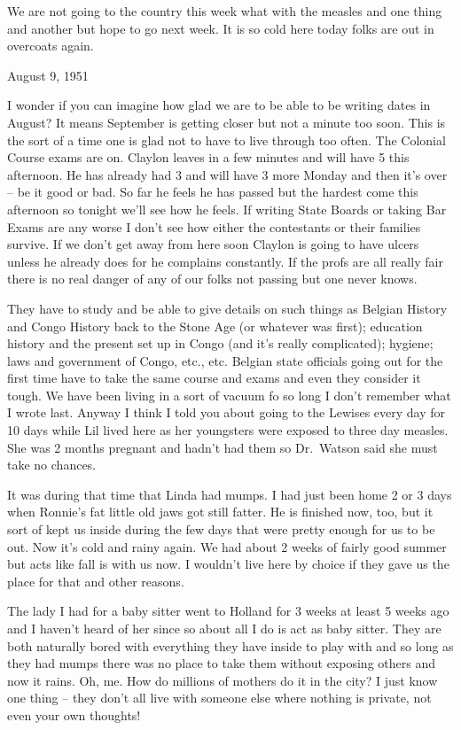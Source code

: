 \documentclass[]{book}
\begin{document}
We are not going to the country this week what with the measles and one thing and another but hope to go next week. It is so cold here today folks are out in overcoats again.

August 9, 1951

I wonder if you can imagine how glad we are to be able to be writing dates in August? It means September is getting closer but not a minute too soon. This is the sort of a time one is glad not to have to live through too often. The Colonial Course exams are on. Claylon leaves in a few minutes and will have 5 this afternoon. He has already had 3 and will have 3 more Monday and then it's over -- be it good or bad. So far he feels he has passed but the hardest come this afternoon so tonight we'll see how he feels. If writing State Boards or taking Bar Exams are any worse I don't see how either the contestants or their families survive. If we don't get away from here soon Claylon is going to have ulcers unless he already does for he complains constantly. If the profs are all really fair there is no real danger of any of our folks not passing but one never knows.

They have to study and be able to give details on such things as Belgian History and Congo History back to the Stone Age (or whatever was first); education history and the present set up in Congo (and it's really complicated); hygiene; laws and government of Congo, etc., etc. Belgian state officials going out for the first time have to take the same course and exams and even they consider it tough. We have been living in a sort of vacuum fo so long I don't remember what I wrote last. Anyway I think I told you about going to the Lewises every day for 10 days while Lil lived here as her youngsters were exposed to three day measles. She was 2 months pregnant and hadn't had them so Dr.~Watson said she must take no chances.

It was during that time that Linda had mumps. I had just been home 2 or 3 days when Ronnie's fat little old jaws got still fatter. He is finished now, too, but it sort of kept us inside during the few days that were pretty enough for us to be out. Now it's cold and rainy again. We had about 2 weeks of fairly good summer but acts like fall is with us now. I wouldn't live here by choice if they gave us the place for that and other reasons.

The lady I had for a baby sitter went to Holland for 3 weeks at least 5 weeks ago and I haven't heard of her since so about all I do is act as baby sitter. They are both naturally bored with everything they have inside to play with and so long as they had mumps there was no place to take them without exposing others and now it rains. Oh, me. How do millions of mothers do it in the city? I just know one thing -- they don't all live with someone else where nothing is private, not even your own thoughts!
\end{document}
